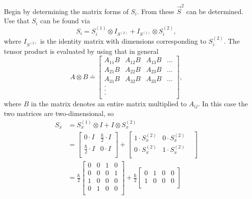 \begin{example}
\begin{enumerate}
		Begin by determining the matrix forms of $S_i$. From these  $\vec{S}^2$ can be determined. Use that $S_i$ can be found via
		\begin{equation}
			S_i=S^{(1)}_i \otimes I_{S^{(2)}} +I_{S^{(1)}}\otimes S^{(2)}_i,
		\end{equation} 
		where $I_{S^{(2)}}$ is the identity matrix with dimensions corresponding to $S^{(2)}_i$. The tensor product is evaluated by using that in general
		\begin{equation}
			A\otimes B\doteq \begin{bmatrix}
				A_{11}B & A_{12}B & A_{13}B & ...\\
				A_{21}B & A_{22}B & A_{23}B & ...\\
				A_{31}B & A_{32}B & A_{33}B & ...\\
				. & & &\\
				. & & &\\
				. & & &\\
			\end{bmatrix},
		\end{equation} 
		where $B$ in the matrix denotes an entire matrix multiplied to $A_{ij}$. In this case the two matrices are two-dimensional, so
		\begin{equation}
			\begin{split}
				S_x&=S^{(1)}_x \otimes I +I\otimes S^{(2)}_x\\
				&=\begin{bmatrix}
					0\cdot I & \frac{\hbar}{2}\cdot I \\
					\frac{\hbar}{2}\cdot I & 0\cdot I\\
				\end{bmatrix}+\begin{bmatrix}
					1\cdot S^{(2)}_x & 0\cdot S^{(2)}_x & \\
					0\cdot S^{(2)}_x & 1\cdot S^{(2)}_x\\
				\end{bmatrix}\\
				&=\frac{\hbar}{2}\begin{bmatrix}
					0 & 0 & 1 & 0 \\
					0 & 0 & 0 & 1 \\
					1 & 0 & 0 & 0 \\
					0 & 1 & 0 & 0 \\
				\end{bmatrix}+\frac{\hbar}{2}\begin{bmatrix}
					0 & 1 & 0 & 0 \\
					1 & 0 & 0 & 0 \\

\end{bmatrix}
\end{split}
\end{equation}
\end{enumerate}
\end{example}

